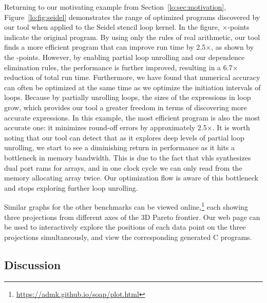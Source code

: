 Returning to our motivating example from Section~\ref{lo:sec:motivation},
Figure~\ref{lo:fig:seidel} demonstrates the range of optimized programs
discovered by our tool when applied to the Seidel stencil loop kernel. In
the figure, $\times$-points indicate the original program. By using only the
rules of real arithmetic, our tool finds a more efficient program that can
improve run time by 2.5$\times$, as shown by the \redcircle-points. However,
by enabling partial loop unrolling and our dependence elimination rules, the
performance is further improved, resulting in a 6.7$\times$ reduction of
total run time.  Furthermore, we have found that numerical accuracy can often
be optimized at the same time as we optimize the initiation intervals of
loops. Because by partially unrolling loops, the sizes of the expressions in
loop grow, which provides our tool a greater freedom in terms of discovering
more accurate expressions. In this example, the most efficient program is
also the most accurate one: it minimizes round-off errors by approximately
2.5$\times$. It is worth noting that our tool can detect that as it explores
deep levels of partial loop unrolling, we start to see a diminishing return
in performance as it hits a bottleneck in memory bandwidth.  This is due to
the fact that \gls{vhls} synthesizes dual port \glspl{ram} for arrays, and in
one clock cycle we can only read from the memory allocating array twice.  Our
optimization flow is aware of this bottleneck and stops exploring further loop
unrolling.

Similar graphs for the other benchmarks can be viewed
online,\footnote{\url{https://admk.github.io/soap/plot.html}} each showing
three projections from different axes of the 3D Pareto frontier. Our web page
can be used to interactively explore the positions of each data point on the
three projections simultaneously, and view the corresponding generated C
programs.

\subsection{Discussion}
\label{lo:sub:discussion}

